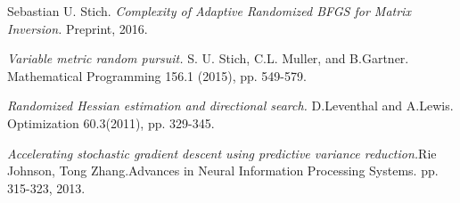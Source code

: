 \documentclass[12pt,conference,compsocconf]{IEEEtran}
\begin{document}
\begin{thebibliography}{1}
Sebastian U. Stich.
\textit{Complexity of Adaptive Randomized BFGS for Matrix Inversion.}
Preprint, 2016.

\textit{Variable metric random pursuit.} S. U. Stich, C.L. Muller, and B.Gartner. Mathematical
Programming 156.1 (2015), pp. 549-579.

\textit{Randomized Hessian estimation and directional search.} D.Leventhal and A.Lewis. Optimization 60.3(2011), pp. 329-345.

\textit{Accelerating stochastic gradient descent using predictive variance reduction.}Rie Johnson, Tong Zhang.Advances in Neural Information Processing Systems. pp. 315-323, 2013.

\end{thebibliography}
\end{document}
